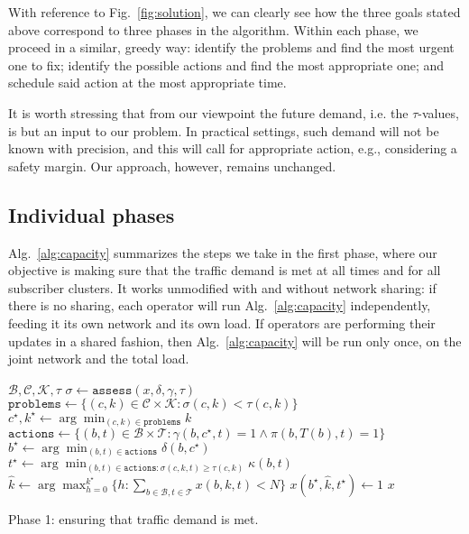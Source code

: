 \documentclass[10pt,journal,cspaper,compsoc]{IEEEtran}
\newcommand{\Fig}[1]{Fig.~\ref{fig:#1}}
\newcommand{\Alg}[1]{Alg.~\ref{alg:#1}}
\newcommand{\Bc}{\mathcal{B}}
\newcommand{\Cc}{\mathcal{C}}
\newcommand{\Kc}{\mathcal{K}}
\newcommand{\Tc}{\mathcal{T}}
\begin{document}
With reference to \Fig{solution}, we can clearly see how the three goals stated above correspond to three
phases in the algorithm. Within each phase, we proceed in a similar, greedy way: identify the problems and find the most
urgent one to fix; identify the possible actions and find the most appropriate one; and schedule said action at the
most appropriate time.

It is worth stressing that from our viewpoint the future demand, i.e. the $\tau$-values, is but an input to
our problem. In practical settings, such demand will not be known with precision, and this will call for 
appropriate action, e.g., considering a safety margin. Our approach, however, remains unchanged.

\subsection{Individual phases}

\Alg{capacity} summarizes the steps we take in the first phase, where our objective is making sure that
the traffic demand is met at all times and for all subscriber clusters.
It works unmodified with and without network sharing: if there is no sharing, each
operator will run \Alg{capacity} independently, feeding it its own network and its own
load. If operators are performing their updates in a shared fashion,
then \Alg{capacity} will be run only once, on the joint network and the total load.

\begin{algorithm}[t]
\begin{algorithmic}[1]
\Require $\Bc,\Cc,\Kc,\tau$
	\State $\sigma \gets \texttt{assess}(x,\delta,\gamma,\tau)$ \label{line:alg1-sim}
	\State $\texttt{problems} \gets \{(c,k)\in\Cc\times\Kc: \sigma(c,k) < \tau(c,k) \}$ \label{line:alg1-findproblem}
	 \label{line:alg1-checkempty}
	\EndIf
	\State $c^\star,k^\star \gets \arg \min_{(c,k)\in\texttt{problems}} k$ \label{line:alg1-mosturgent}
	\State $ \texttt{actions} \gets \{ (b,t)\in\Bc\times\Tc: \gamma(b,c^\star,t)=1 \wedge \pi(b,T(b),t)=1 \}$ \label{line:alg1-findbss}
	\State $ b^\star \gets \arg \min_{(b,t)\in\texttt{actions}} \delta(b,c^\star)$ \label{line:alg1-bestbs}
	\State $ t^\star \gets \arg \min_{(b,t)\in\texttt{actions}\colon \sigma(c,k,t)\geq\tau(c,k)} \kappa(b,t)$ \label{line:alg1-besttype}
	\State $ \hat{k} \gets \arg \max_{h=0}^{k^\star} \{ h: \sum_{b\in\Bc,t\in\Tc} x(b,k,t) < N \} $ \label{line:alg1-besttime}
	\State $ x(b^\star,\hat{k},t^\star) \gets 1$ \label{line:alg1-schedule}
\EndWhile
\Return $x$
\end{algorithmic}
\caption{Phase 1: ensuring that traffic demand is met.
  \label{alg:capacity}}
\end{algorithm}
\end{document}
